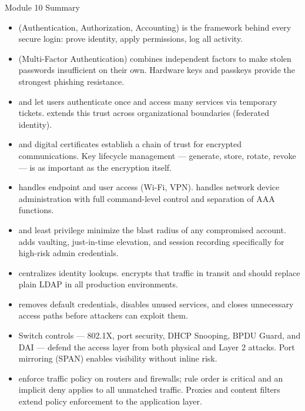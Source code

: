 \documentclass[aspectratio=169]{beamer}  %
\begin{document}
\begin{frame}[t,allowframebreaks]{Module 10 Summary}
    \small
    \begin{itemize}
        \item {} (Authentication, Authorization, Accounting) is the framework behind every secure login: prove identity, apply permissions, log all activity.
        \item {} (Multi-Factor Authentication) combines independent factors to make stolen passwords insufficient on their own. Hardware keys and passkeys provide the strongest phishing resistance.
        \item {} and  let users authenticate once and access many services via temporary tickets.  extends this trust across organizational boundaries (federated identity).
        \item {} and digital certificates establish a chain of trust for encrypted communications. Key lifecycle management --- generate, store, rotate, revoke --- is as important as the encryption itself.
        \item {} handles endpoint and user access (Wi-Fi, VPN).  handles network device administration with full command-level control and separation of AAA functions.
        \item {} and least privilege minimize the blast radius of any compromised account.  adds vaulting, just-in-time elevation, and session recording specifically for high-risk admin credentials.
        \item {} centralizes identity lookups.  encrypts that traffic in transit and should replace plain LDAP in all production environments.
        \item {} removes default credentials, disables unused services, and closes unnecessary access paths before attackers can exploit them.
        \item Switch controls --- 802.1X, port security, DHCP Snooping, BPDU Guard, and DAI --- defend the access layer from both physical and Layer 2 attacks. Port mirroring (SPAN) enables visibility without inline risk.
        \item {} enforce traffic policy on routers and firewalls; rule order is critical and an implicit deny applies to all unmatched traffic. Proxies and content filters extend policy enforcement to the application layer.
    \end{itemize}
\end{frame}
\end{document}
